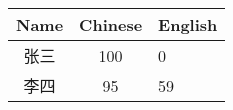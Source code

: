 \documentclass{ctexart}
\begin{document}
	
	
	\begin{tabular}{| c || c | p{1cm} |}
		\hline \hline	
		Name & Chinese & English \\
		\hline
		张三 & 100	 & 0	   \\
		\hline
		李四 & 95		 & 59	   \\
		\hline
		
	\end{tabular}
	
\end{document}
